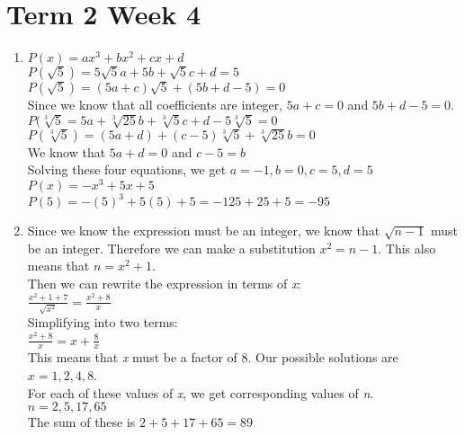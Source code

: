 \documentclass[../main.tex]{subfiles}
\begin{document}
\section*{Term 2 Week 4}
\begin{enumerate}
    \item 
    \(P(x)=ax^3+bx^2+cx+d\)\\
    
    \(P(\sqrt{5})=5\sqrt{5}a+5b+\sqrt{5}c+d=5\)\\
    \(P(\sqrt{5})=(5a+c)\sqrt{5}+(5b+d-5)=0\)\\
    Since we know that all coefficients are integer, \(5a+c=0\) and \(5b+d-5=0\).\\

    \(P(\sqrt[3]{5}=5a+\sqrt[3]{25}b+\sqrt[3]{5}c+d-5\sqrt[3]{5}=0\)\\
    \(P(\sqrt[3]{5})=(5a+d)+(c-5)\sqrt[3]{5}+\sqrt[3]{25}b=0\)\\
    We know that \(5a+d=0\) and \(c-5=b\)\\

    Solving these four equations, we get \(a=-1, b=0, c=5, d=5\)\\
    \(P(x)=-x^3+5x+5\)\\
    \(P(5)=-(5)^3+5(5)+5=-125+25+5=-95\)\\

    \item 
    Since we know the expression must be an integer, we know that \(\sqrt{n-1}\) must be an integer. Therefore we can make a substitution \(x^2=n-1\). This also means that \(n=x^2 +1\).\\

    Then we can rewrite the expression in terms of \textit{x}:\\
    \(\frac{x^2+1+7}{\sqrt{x^2}}=\frac{x^2+8}{x}\)\\

    Simplifying into two terms:\\
    \(\frac{x^2+8}{x}=x+\frac{8}{x}\)\\

    This means that \textit{x} must be a factor of 8. Our possible solutions are \(x=1, 2, 4, 8\).\\

    For each of these values of \textit{x}, we get corresponding values of \textit{n}.\\
    \(n=2, 5, 17, 65\)\\
    The sum of these is \(2+5+17+65=89\)\\


\end{enumerate}
\end{document}

